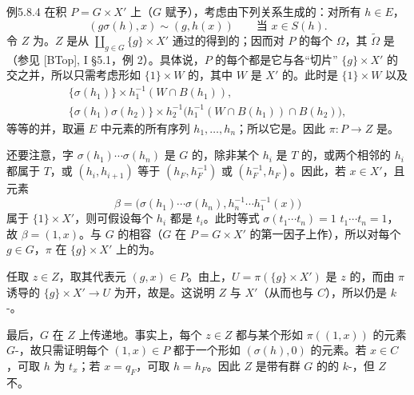\begin{SGAresult}{例}{5.8.4}
在积 $P=G\times X'$ 上（$G$ 赋予），考虑由下列关系生成的：对所有 $h\in E$，
\[
(g\sigma(h),x)\sim(g,h(x))\qquad\text{当 }x\in S(h).
\]
令 $Z$ 为。$Z$ 是从 $\coprod_{g\in G}\{g\}\times X'$ 通过的得到的；因而对 $P$ 的每个 $\Omega$，其 $\widetilde\Omega$ 是（参见 [BTop], I \S5.1，例 2）。具体说，$P$ 的每个都是它与各“切片” $\{g\}\times X'$ 的交之并，所以只需考虑形如 $\{1\}\times W$ 的，其中 $W$ 是 $X'$ 的。此时是 $\{1\}\times W$ 以及
\begin{gather*}
\{\sigma(h_1)\}\times h_1^{-1}(W\cap B(h_1)),\\
\{\sigma(h_1)\sigma(h_2)\}\times h_2^{-1}\bigl(h_1^{-1}(W\cap B(h_1))\cap B(h_2)\bigr),
\end{gather*}
等等的并，取遍 $E$ 中元素的所有序列 $h_1,\ldots,h_n$；所以它是。因此 $\pi:P\to Z$ 是。

还要注意，字 $\sigma(h_1)\cdots\sigma(h_n)$ 是 $G$ 的，除非某个 $h_i$ 是 $T$ 的，或两个相邻的 $h_i$ 都属于 $T$，或 $(h_i,h_{i+1})$ 等于 $(h_F,h_F^{-1})$ 或 $(h_F^{-1},h_F)$。因此，若 $x\in X'$，且元素
\[
\beta=\bigl(\sigma(h_1)\cdots\sigma(h_n),h_n^{-1}\cdots h_1^{-1}(x)\bigr)
\]
属于 $\{1\}\times X'$，则可假设每个 $h_i$ 都是 $t_i$。此时等式 $\sigma(t_1\cdots t_n)=1$  $t_1\cdots t_n=1$，故 $\beta=(1,x)$。与 $G$ 的相容（$G$ 在 $P=G\times X'$ 的第一因子上作），所以对每个 $g\in G$，$\pi$ 在 $\{g\}\times X'$ 上的为。

任取 $z\in Z$，取其代表元 $(g,x)\in P$。由上，$U=\pi(\{g\}\times X')$ 是 $z$ 的，而由 $\pi$ 诱导的 $\{g\}\times X'\to U$ 为开，故是。这说明 $Z$ 与 $X'$（从而也与 $C$），所以仍是 $k$-。

最后，$G$ 在 $Z$ 上传递地。事实上，每个 $z\in Z$ 都与某个形如 $\pi((1,x))$ 的元素 $G$-，故只需证明每个 $(1,x)\in P$ 都于一个形如 $(\sigma(h),0)$ 的元素。若 $x\in C$，可取 $h$ 为 $t_x$；若 $x=q_F$，可取 $h=h_F$。因此 $Z$ 是带有群 $G$ 的的 $k$-，但 $Z$ 不。
\end{SGAresult}
